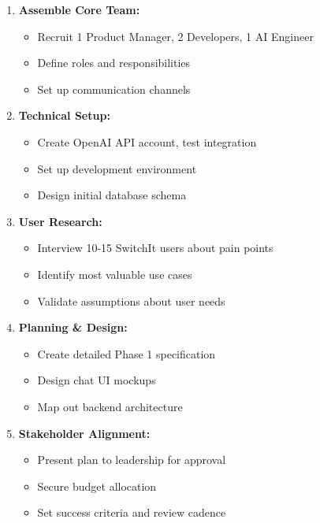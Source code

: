 \documentclass[12pt,a4paper]{article}
\begin{document}
\begin{enumerate}[leftmargin=*]
    \item \textbf{Assemble Core Team:}
    \begin{itemize}
        \item Recruit 1 Product Manager, 2 Developers, 1 AI Engineer
        \item Define roles and responsibilities
        \item Set up communication channels
    \end{itemize}
    
    \item \textbf{Technical Setup:}
    \begin{itemize}
        \item Create OpenAI API account, test integration
        \item Set up development environment
        \item Design initial database schema
    \end{itemize}
    
    \item \textbf{User Research:}
    \begin{itemize}
        \item Interview 10-15 SwitchIt users about pain points
        \item Identify most valuable use cases
        \item Validate assumptions about user needs
    \end{itemize}
    
    \item \textbf{Planning \& Design:}
    \begin{itemize}
        \item Create detailed Phase 1 specification
        \item Design chat UI mockups
        \item Map out backend architecture
    \end{itemize}
    
    \item \textbf{Stakeholder Alignment:}
    \begin{itemize}
        \item Present plan to leadership for approval
        \item Secure budget allocation
        \item Set success criteria and review cadence
    \end{itemize}
\end{enumerate}
\end{document}
